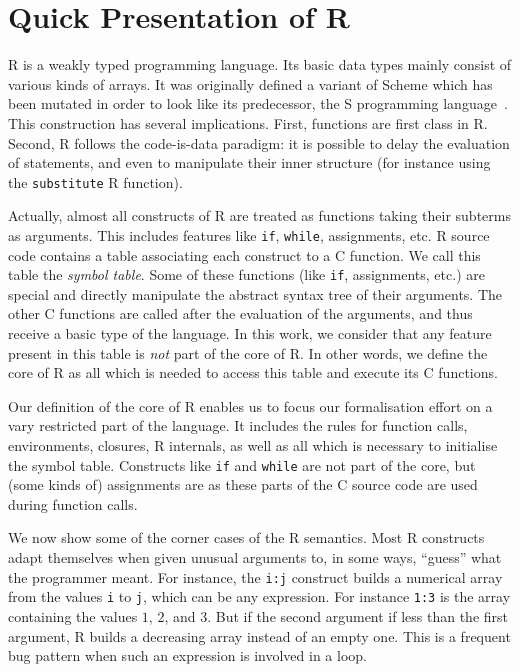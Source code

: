 \documentclass[9pt, sigplan, natbib=false, screen=true]{acmart}
\newcommand\R{R}
\newcommand\Cn{C}
\begin{document}
\section{Quick Presentation of \R{}}
\label{sec:presentation}

\R{} is a weakly typed programming language.
Its basic data types mainly consist of various kinds of arrays.
It was originally defined a variant of Scheme
which has been mutated in order to look like its predecessor,
the S programming language~\parencite{ihaka1996r}.
This construction has several implications.
First, functions are first class in \R{}.
Second, \R{} follows the code-is-data paradigm:
it is possible to delay the evaluation of statements,
and even to manipulate their inner structure
(for instance using the \texttt{substitute} \R{} function).

Actually, almost all constructs of \R{} are treated
as functions taking their subterms as arguments.
This includes features like \texttt{if}, \texttt{while},
assignments, etc.
\R{} source code contains a table associating each construct
to a \Cn{} function.
We call this table the \emph{symbol table}.
Some of these functions (like \texttt{if}, assignments, etc.)
are special and directly manipulate the abstract syntax tree
of their arguments.
The other \Cn{} functions are called after the evaluation of the arguments,
and thus receive a basic type of the language.
%
In this work,
we consider that any feature present in this table
is \emph{not} part of the core of \R{}.
In other words, we define the core of \R{}
as all which is needed to access this table
and execute its \Cn{} functions.

Our definition of the core of \R{} enables us to focus
our formalisation effort on a vary restricted part of the language.
It includes the rules for function calls,
environments, closures, \R{} internals,
as well as all which is necessary to initialise the symbol table.
Constructs like \texttt{if} and \texttt{while}
are not part of the core,
but (some kinds of) assignments are
as these parts of the \Cn{} source code
are used during function calls.

We now show some of the corner cases of the \R{} semantics.
Most \R{} constructs adapt themselves when given unusual arguments
to, in some ways, ``guess'' what the programmer meant.
For instance, the \texttt{i:j} construct
builds a numerical array from the values \texttt{i}
to \texttt{j}, which can be any expression.
For instance \texttt{1:3} is the array containing
the values \(1\), \(2\), and \(3\).
But if the second argument if less than the first argument,
\R{} builds a decreasing array instead of an empty one.
This is a frequent bug pattern when such an expression is involved in a loop.
\end{document}
